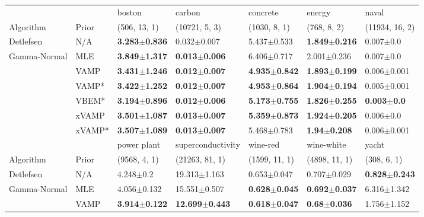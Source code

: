 \begin{tabular}{lllllll}
\toprule
             &        &                    boston &                    carbon &                  concrete &                    energy &                   naval \\
Algorithm & Prior& (506, 13, 1)& (10721, 5, 3)& (1030, 8, 1)& (768, 8, 2)& (11934, 16, 2)\\
\midrule
Detlefsen & N/A &  \textbf{3.283$\pm$0.836} &           0.032$\pm$0.007 &           5.437$\pm$0.533 &  \textbf{1.849$\pm$0.216} &           0.007$\pm$0.0 \\
Gamma-Normal & MLE &  \textbf{3.849$\pm$1.317} &  \textbf{0.013$\pm$0.006} &           6.406$\pm$0.717 &           2.001$\pm$0.236 &           0.007$\pm$0.0 \\
             & VAMP &  \textbf{3.431$\pm$1.246} &  \textbf{0.012$\pm$0.007} &  \textbf{4.935$\pm$0.842} &  \textbf{1.893$\pm$0.199} &         0.006$\pm$0.001 \\
             & VAMP* &  \textbf{3.422$\pm$1.252} &  \textbf{0.012$\pm$0.007} &  \textbf{4.953$\pm$0.864} &  \textbf{1.904$\pm$0.194} &         0.005$\pm$0.001 \\
             & VBEM* &  \textbf{3.194$\pm$0.896} &  \textbf{0.012$\pm$0.006} &  \textbf{5.173$\pm$0.755} &  \textbf{1.826$\pm$0.255} &  \textbf{0.003$\pm$0.0} \\
             & xVAMP &  \textbf{3.501$\pm$1.087} &  \textbf{0.013$\pm$0.007} &  \textbf{5.359$\pm$0.873} &  \textbf{1.924$\pm$0.205} &           0.006$\pm$0.0 \\
             & xVAMP* &  \textbf{3.507$\pm$1.089} &  \textbf{0.013$\pm$0.007} &           5.468$\pm$0.783 &   \textbf{1.94$\pm$0.208} &         0.006$\pm$0.001 \\
\midrule
             &        &               power plant &          superconductivity &                  wine-red &                wine-white &                     yacht \\
Algorithm & Prior& (9568, 4, 1)& (21263, 81, 1)& (1599, 11, 1)& (4898, 11, 1)& (308, 6, 1)\\
\midrule
Detlefsen & N/A &             4.248$\pm$0.2 &           19.313$\pm$1.163 &           0.653$\pm$0.047 &           0.707$\pm$0.029 &  \textbf{0.828$\pm$0.243} \\
Gamma-Normal & MLE &           4.056$\pm$0.132 &           15.551$\pm$0.507 &  \textbf{0.628$\pm$0.045} &  \textbf{0.692$\pm$0.037} &           6.316$\pm$1.342 \\
             & VAMP &  \textbf{3.914$\pm$0.122} &  \textbf{12.699$\pm$0.443} &  \textbf{0.618$\pm$0.047} &   \textbf{0.68$\pm$0.036} &           1.756$\pm$1.152 \\

\end{tabular}
